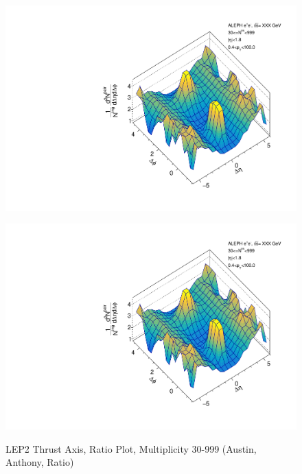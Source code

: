 \begin{figure}[htbp]
  \caption{LEP2 Thrust Axis, Ratio Plot, Multiplicity 30-999 (Austin, Anthony, Ratio)}
  \begin{minipage}[b]{0.32\linewidth}
    \centering
    \includegraphics[width=\linewidth]{images/TwoParticleCorrelation/LEP2_THRUST/LEP2_THRUST_ratio1_30_999.pdf}
    \label{fig:LEP2 Thrust Axis, Ratio Plot, Multiplicity 30-999, Austin}
  \end{minipage}
  \hspace{0.0cm}
  \begin{minipage}[b]{0.32\linewidth}
    \centering
    \includegraphics[width=\linewidth]{images/TwoParticleCorrelation/LEP2_THRUST/LEP2_THRUST_ratio2_30_999.pdf}
    \label{fig:LEP2 Thrust Axis, Ratio Plot, Multiplicity 30-999, Anthony}

\end{minipage}
\end{figure}

